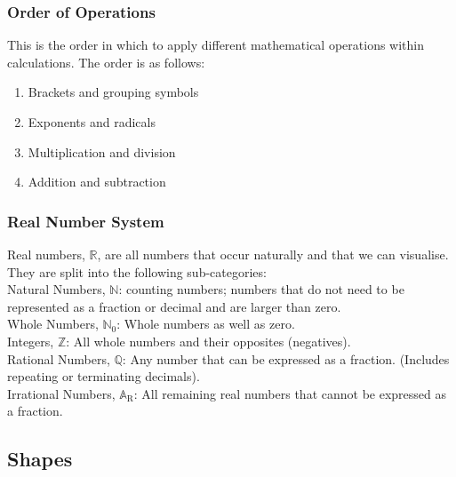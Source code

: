 \documentclass[11pt, fleqn]{article}
\begin{document}
\subsubsection{Order of Operations}
This is the order in which to apply different mathematical operations within calculations. The order is as follows:
\begin{enumerate}
    \item Brackets and grouping symbols
    \item Exponents and radicals
    \item Multiplication and division
    \item Addition and subtraction
\end{enumerate}

\subsubsection{Real Number System}
Real numbers, $\mathbb{R}$, are all numbers that occur naturally and that we can visualise. They are split into the following sub-categories:\\
Natural Numbers, $\mathbb{N}$: counting numbers; numbers that do not need to be represented as a fraction or decimal and are larger than zero.\\
Whole Numbers, $\mathbb{N}_\mathrm{0}$: Whole numbers as well as zero.\\
Integers, $\mathbb{Z}$: All whole numbers and their opposites (negatives).\\
Rational Numbers, $\mathbb{Q}$: Any number that can be expressed as a fraction. (Includes repeating or terminating decimals).\\
Irrational Numbers, $\mathbb{A}_\mathrm{R}$: All remaining real numbers that cannot be expressed as a fraction.










\subsection{Shapes}
\end{document}
